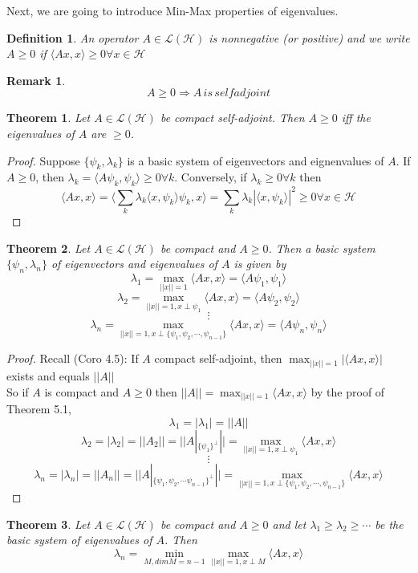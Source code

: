 \documentclass{article}
\newtheorem{Thm}{Theorem}[section]
\newtheorem{Def}{Definition}[section]
\newtheorem{rmk}{Remark}[section]
\newcommand{\HH}{\mathcal{H}}
\newcommand{\LL}{\mathcal{L}}
\begin{document}
Next, we are going to introduce Min-Max properties of eigenvalues.
\begin{Def}
	An operator $A\in \LL(\HH)$ is nonnegative (or positive) and we write $A\geq 0$ if $\langle Ax, x \rangle\geq 0 \forall x\in \HH$ 
\end{Def}
\begin{rmk}
	\[ A\geq 0 \Rightarrow A\, is\, self adjoint\]
\end{rmk}
\begin{Thm}
	Let $A\in \LL(\HH)$ be compact self-adjoint. Then $A\geq 0$ iff the eigenvalues of $A$ are $\geq 0$.
\end{Thm}
\begin{proof}
	Suppose $\{\psi_k, \lambda_k\}$ is a basic system of eigenvectors and eignenvalues of $A$. If $A\geq 0$, then $\lambda_k=\langle A\psi_k, \psi_k\rangle\geq 0 \forall k$. Conversely, if $\lambda_k \geq 0 \forall k$ then \[ \langle Ax,x \rangle = \langle \sum_k \lambda_k \langle x, \psi_k \rangle \psi_k , x\rangle = \sum_k \lambda_k |\langle x, \psi_k\rangle|^2 \geq 0 \forall x\in \HH\]
\end{proof}
\begin{Thm}
	Let $A\in \LL(\HH)$ be compact and $A\geq 0 $. Then a basic system $\{\psi_n, \lambda_n\}$ of eigenvectors and eigenvalues of $A$ is given by
	\[\lambda_1 = \max_{||x||=1}{\langle Ax,x \rangle} = \langle A \psi_1, \psi_1 \rangle \]
	\[\lambda_2 = \max_{||x||=1, x\perp \psi_1}{\langle Ax,x \rangle} = \langle A \psi_2, \psi_2 \rangle\]
	\[\vdots\]
	\[\lambda_n = \max_{||x||=1, x\perp \{\psi_1, \psi_2, \cdots , \psi_{n-1}\}}{\langle Ax,x \rangle} = \langle A \psi_n, \psi_n \rangle\]
\end{Thm}
\begin{proof}
	Recall (Coro 4.5): If $A$ compact self-adjoint, then $\max_{||x||=1}{|\langle Ax,x \rangle |}$ exists and equals $||A||$ \\
	So if $A$ is compact and $A\geq 0$ then $||A||= \max_{||x||=1}{\langle Ax,x \rangle }$ by the proof of Theorem 5.1, 
	\[\lambda_1=|\lambda_1| = ||A|| \]
	\[\lambda_2=|\lambda_2| = ||A_2|| = ||A|_{\{\psi_1\}^\perp }||= \max_{||x||=1, x\perp \psi_1}{\langle Ax,x \rangle} \]
	\[\vdots\]
	\[\lambda_n=|\lambda_n| = ||A_n|| = ||A|_{\{\psi_1, \psi_2, \cdots \psi_{n-1} \}^\perp }||= \max_{||x||=1, x\perp \{\psi_1, \psi_2, \cdots , \psi_{n-1}\}}{\langle Ax,x \rangle} \]
\end{proof}
\begin{Thm}
	Let $A\in \LL(\HH)$ be compact and $A\geq 0$ and let $\lambda_1 \geq \lambda_2\geq \cdots$ be the basic system of eigenvalues of $A$. Then 
	\[\lambda_n = \min_{M, dim M = n-1} \max_{||x||=1, x \perp M} \langle Ax,x \rangle\]
\end{Thm}
\end{document}
